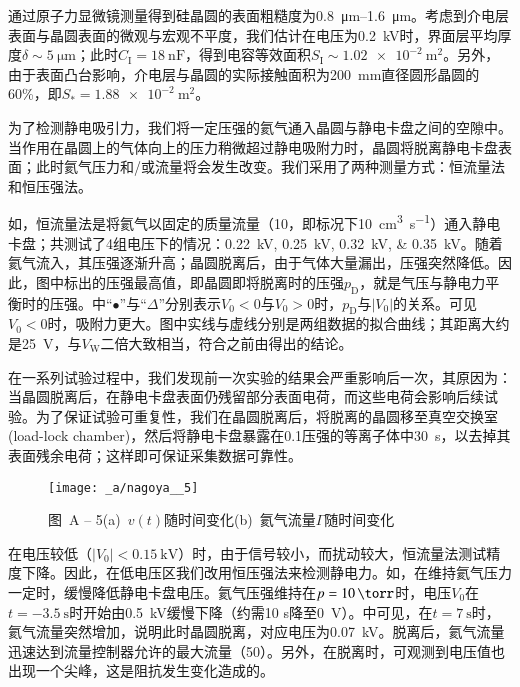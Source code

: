 通过原子力显微镜测量得到硅晶圆的表面粗糙度为\SIrange{0.8}{1.6}{\um}。考虑到介电层表面与晶圆表面的微观与宏观不平度，我们估计在电压为\SI{0.2}{\kV}时，界面层平均厚度$\delta \sim \SI{5}{\um}$；此时$C_{\mathrm{I}}=\SI{18}{\nano\farad}$，得到电容等效面积$S_{\mathrm{I}} \sim \SI{1.02e-2}{\m^2}$。另外，由于表面凸台影响，介电层与晶圆的实际接触面积为\SI{200}{\mm}直径圆形晶圆的60\%\footnotemark{}，即$S_*=\SI{1.88e-2}{\m^2}$。


为了检测静电吸引力，我们将一定压强的氦气通入晶圆与静电卡盘之间的空隙中。当作用在晶圆上的气体向上的压力稍微超过静电吸附力时，晶圆将脱离静电卡盘表面；此时氦气压力和/或流量将会发生改变。我们采用了两种测量方式：恒流量法和恒压强法。

如，恒流量法是将氦气以固定的质量流量（\SI{10}{\sccm}，即标况下\SI{10}{\cm^3\per\s}）通入静电卡盘；共测试了4组电压下的情况：\SIlist[list-separator={，},list-final-separator={，以及}]{0.22;0.25;0.32;0.35}{\kV}。随着氦气流入，其压强逐渐升高；晶圆脱离后，由于气体大量漏出，压强突然降低。因此，图中标出的压强最高值，即晶圆即将脱离时的压强$p_{\mathrm{D}}$，就是气压与静电力平衡时的压强。中``$\bullet$''与``$\Delta$''分别表示$V_0 < 0$与$V_0 > 0$时，$p_{\mathrm{D}}$与$\left|V_0\right|$的关系。可见$V_0 < 0$时，吸附力更大。图中实线与虚线分别是两组数据的拟合曲线；其距离大约是\SI{25}{\V}，与$V_{\mathrm{W}}$二倍大致相当，符合之前由得出的结论。

在一系列试验过程中，我们发现前一次实验的结果会严重影响后一次，其原因为：当晶圆脱离后，在静电卡盘表面仍残留部分表面电荷，而这些电荷会影响后续试验。为了保证试验可重复性，我们在晶圆脱离后，将脱离的晶圆移至真空交换室(load-lock chamber)，然后将静电卡盘暴露在\SI{0.1}{\torr}压强的等离子体中\SI{30}{\s}，以去掉其表面残余电荷；这样即可保证采集数据可靠性。

\begin{figure}[tbhp]
\centering
\texttt{[image: \_a/nagoya\_\_5]}
\caption*{图~A -- 5\hspace{1em}(a)\ $v(t)$随时间变化\quad (b)\ 氦气流量$\Gamma$随时间变化}
\end{figure}

在电压较低（$\left|V_0\right| < \SI{0.15}{\kV}$）时，由于信号较小，而扰动较大，恒流量法测试精度下降。因此，在低电压区我们改用恒压强法来检测静电力。如，在维持氦气压力一定时，缓慢降低静电卡盘电压。氦气压强维持在$p = \SI{10}{\torr}$时，电压$V_0$在$t=\SI{-3.5}{\s}$时开始由\SI{0.5}{\kV}缓慢下降（约需10 s降至\SI{0}{\V}）。中可见，在$t=\SI{7}{\s}$时，氦气流量突然增加，说明此时晶圆脱离，对应电压为\SI{0.07}{\kV}。脱离后，氦气流量迅速达到流量控制器允许的最大流量（\SI{50}{\sccm}）。另外，在脱离时，可观测到电压值也出现一个尖峰，这是阻抗发生变化造成的。

